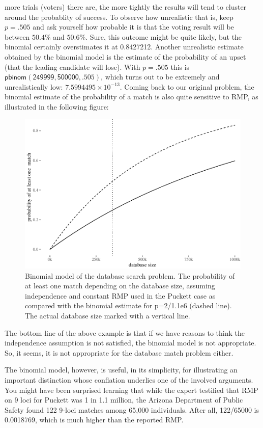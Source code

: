 \documentclass[10pt,dvipsnames,enabledeprecatedfontcommands]{scrartcl}
\begin{document}
more trials (voters) there are, the more tightly the results will tend
to cluster around the probablity of success. To observe how unrealistic
that is, keep \(p=.505\) and ask yourself how probable it is that the
voting result will be between \(50.4\%\) and \(50.6\%\). Sure, this
outcome might be quite likely, but the binomial certainly overstimates
it at 0.8427212. Another unrealistic estimate obtained by the binomial
model is the estimate of the probability of an upset (that the leading
candidate will lose). With \(p=.505\) this is
\(\mathsf{pbinom(249999,500000,.505)}\), which turns out to be extremely
and unrealistically low: \ensuremath{7.5994495\times 10^{-13}}. Coming
back to our original problem, the binomial estimate of the probability
of a match is also quite sensitive to RMP, as illustrated in the
following figure:

\begin{figure}

{\centering \includegraphics[width=0.8\linewidth]{lr-chapter2_files/figure-latex/puckett-1} 

}

\caption{Binomial model of the database search problem. The probability of at least one match depending on the database size, assuming independence and constant RMP used in  the Puckett case as compared with the binomial estimate for p=2/1.1e6 (dashed line). The actual database size marked with a vertical line.}\label{fig:puckett}
\end{figure}

The bottom line of the above example is that if we have reasons to think
the independence assumption is not satisfied, the binomial model is not
appropriate. So, it seems, it is not appropriate for the database match
problem either.

The binomial model, however, is useful, in its simplicity, for
illustrating an important distinction whose conflation underlies one of
the involved arguments. You might have been surprised learning that
while the expert testified that RMP on 9 loci for Puckett was 1 in 1.1
million, the Arizona Department of Public Safety found 122 9-loci
matches among 65,000 individuals. After all, 122/65000 is 0.0018769,
which is much higher than the reported RMP.
\end{document}
